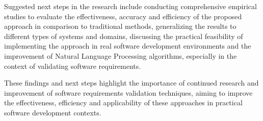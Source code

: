 Suggested next steps in the research include conducting comprehensive empirical studies to evaluate the effectiveness, accuracy and efficiency of the proposed approach in comparison to traditional methods, generalizing the results to different types of systems and domains, discussing the practical feasibility of implementing the approach in real software development environments and the improvement of Natural Language Processing algorithms, especially in the context of validating software requirements.

These findings and next steps highlight the importance of continued research and improvement of software requirements validation techniques, aiming to improve the effectiveness, efficiency and applicability of these approaches in practical software development contexts.
